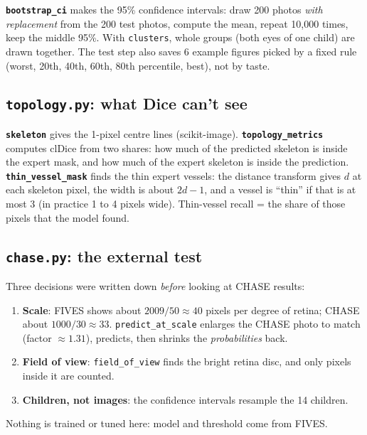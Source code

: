 \textbf{\texttt{bootstrap\_ci}} makes the 95\% confidence intervals: draw 200 photos \emph{with replacement} from the 200 test photos, compute the mean, repeat 10{,}000 times, keep the middle 95\%. With \texttt{clusters}, whole groups (both eyes of one child) are drawn together. The test step also saves 6 example figures picked by a fixed rule (worst, 20th, 40th, 60th, 80th percentile, best), not by taste.

\subsection{\texttt{topology.py}: what Dice can't see}
\textbf{\texttt{skeleton}} gives the 1-pixel centre lines (scikit-image). \textbf{\texttt{topology\_metrics}} computes clDice from two shares: how much of the predicted skeleton is inside the expert mask, and how much of the expert skeleton is inside the prediction. \textbf{\texttt{thin\_vessel\_mask}} finds the thin expert vessels: the distance transform gives $d$ at each skeleton pixel, the width is about $2d-1$, and a vessel is ``thin'' if that is at most 3 (in practice 1 to 4 pixels wide). Thin-vessel recall = the share of those pixels that the model found.

\subsection{\texttt{chase.py}: the external test}
Three decisions were written down \emph{before} looking at CHASE results:
\begin{enumerate}
  \item \textbf{Scale}: FIVES shows about $2009/50 \approx 40$ pixels per degree of retina; CHASE about $1000/30 \approx 33$. \texttt{predict\_at\_scale} enlarges the CHASE photo to match (factor $\approx1.31$), predicts, then shrinks the \emph{probabilities} back.
  \item \textbf{Field of view}: \texttt{field\_of\_view} finds the bright retina disc, and only pixels inside it are counted.
  \item \textbf{Children, not images}: the confidence intervals resample the 14 children.
\end{enumerate}
Nothing is trained or tuned here: model and threshold come from FIVES.

